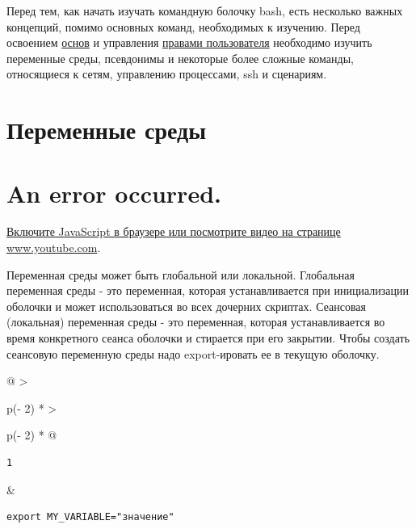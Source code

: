 \documentclass{report}
\begin{document}
Перед тем, как начать изучать командную болочку bash, есть несколько
важных концепций, помимо основных команд, необходимых к изучению. Перед
освоением \href{}{основ} и управления
\href{blog/2019/user-permissions/}{правами пользователя} необходимо
изучить переменные среды, псевдонимы и некоторые более сложные команды,
относящиеся к сетям, управлению процессами, ssh и сценариям.

\hypertarget{Environment-variables}{%
\section{\texorpdfstring{\protect\hyperlink{Environment-variables}{}Переменные
среды}{Переменные среды}}\label{Environment-variables}}

\hypertarget{player}{}

\hypertarget{an-error-occurred.}{%
\section{An error occurred.}\label{an-error-occurred.}}

\href{https://www.youtube.com/watch?v=5e-kS5LkByc}{Включите JavaScript в
браузере или посмотрите видео на странице www.youtube.com}.

Переменная среды может быть глобальной или локальной. Глобальная
переменная среды - это переменная, которая устанавливается при
инициализации оболочки и может использоваться во всех дочерних скриптах.
Сеансовая (локальная) переменная среды - это переменная, которая
устанавливается во время конкретного сеанса оболочки и стирается при его
закрытии. Чтобы создать сеансовую переменную среды надо export-ировать
ее в текущую оболочку.

\begin{longtable}[]{@{}
  >{\raggedright\arraybackslash}p{(\columnwidth - 2\tabcolsep) * }
  >{\raggedright\arraybackslash}p{(\columnwidth - 2\tabcolsep) * }@{}}
\toprule
\endhead
\begin{minipage}[t]{\linewidth}\raggedright
\begin{verbatim}
1
\end{verbatim}
\end{minipage} & \begin{minipage}[t]{\linewidth}\raggedright
\begin{verbatim}
export MY_VARIABLE="значение"
\end{verbatim}
\end{minipage} \\ \addlinespace
\bottomrule
\end{longtable}
\end{document}
